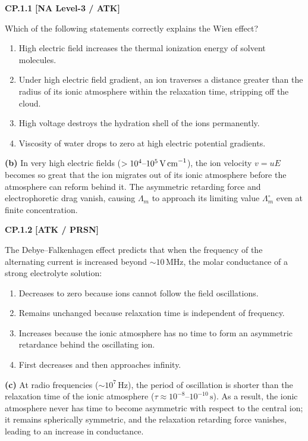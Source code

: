\begin{problembox}
\textbf{CP.1.1} \hfill \textbf{[NA Level-3 / ATK]}

Which of the following statements correctly explains the Wien effect?
\begin{enumerate}[label=(\alph*)]
    \item High electric field increases the thermal ionization energy of solvent molecules.
    \item Under high electric field gradient, an ion traverses a distance greater than the radius of its ionic atmosphere within the relaxation time, stripping off the cloud.
    \item High voltage destroys the hydration shell of the ions permanently.
    \item Viscosity of water drops to zero at high electric potential gradients.
\end{enumerate}
\end{problembox}
\begin{solution}
\textbf{(b)} In very high electric fields ($> 10^4\text{--}10^5\,\text{V\,cm}^{-1}$), the ion velocity $v = uE$ becomes so great that the ion migrates out of its ionic atmosphere before the atmosphere can reform behind it. The asymmetric retarding force and electrophoretic drag vanish, causing $\Lambda_m$ to approach its limiting value $\Lambda_m^\circ$ even at finite concentration.
\end{solution}

\begin{problembox}
\textbf{CP.1.2} \hfill \textbf{[ATK / PRSN]}

The Debye--Falkenhagen effect predicts that when the frequency of the alternating current is increased beyond $\sim 10\,\text{MHz}$, the molar conductance of a strong electrolyte solution:
\begin{enumerate}[label=(\alph*)]
    \item Decreases to zero because ions cannot follow the field oscillations.
    \item Remains unchanged because relaxation time is independent of frequency.
    \item Increases because the ionic atmosphere has no time to form an asymmetric retardance behind the oscillating ion.
    \item First decreases and then approaches infinity.
\end{enumerate}
\end{problembox}
\begin{solution}
\textbf{(c)} At radio frequencies ($\sim 10^7\,\text{Hz}$), the period of oscillation is shorter than the relaxation time of the ionic atmosphere ($\tau \approx 10^{-8}\text{--}10^{-10}\,\text{s}$). As a result, the ionic atmosphere never has time to become asymmetric with respect to the central ion; it remains spherically symmetric, and the relaxation retarding force vanishes, leading to an increase in conductance.
\end{solution}

